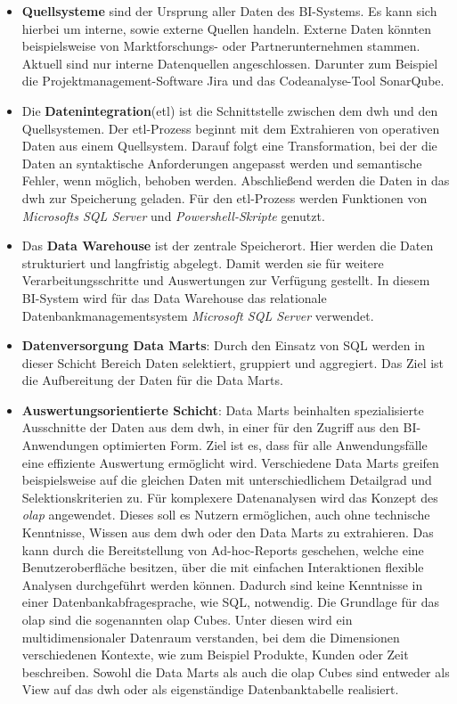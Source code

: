 \begin{itemize}
\item \textbf{Quellsysteme} sind der Ursprung aller Daten des BI-Systems. Es kann sich hierbei um interne, sowie externe Quellen handeln. Externe Daten könnten beispielsweise von Marktforschungs- oder Partnerunternehmen stammen. Aktuell sind nur interne Datenquellen angeschlossen. Darunter zum Beispiel die Projektmanagement-Software Jira und das Codeanalyse-Tool SonarQube.
\item Die \textbf{Datenintegration}(\acs{etl}) ist die Schnittstelle zwischen dem \ac{dwh} und den Quellsystemen. Der \acs{etl}-Prozess beginnt mit dem Extrahieren von operativen Daten aus einem Quellsystem. Darauf folgt eine Transformation, bei der die Daten an syntaktische Anforderungen angepasst werden und semantische Fehler, wenn möglich, behoben werden. Abschließend werden die Daten in das \ac{dwh} zur Speicherung geladen. Für den \acs{etl}-Prozess werden Funktionen von \textit{Microsofts SQL Server} und \textit{Powershell-Skripte} genutzt.
\item Das \textbf{Data Warehouse} ist der zentrale Speicherort. Hier werden die Daten strukturiert und langfristig abgelegt. Damit werden sie für weitere Verarbeitungsschritte und Auswertungen zur Verfügung gestellt. In diesem BI-System wird für das Data Warehouse das relationale Datenbankmanagementsystem \textit{Microsoft SQL Server} verwendet.
\item \textbf{Datenversorgung Data Marts}: Durch den Einsatz von SQL werden in dieser Schicht Bereich Daten selektiert, gruppiert und aggregiert. Das Ziel ist die Aufbereitung der Daten für die Data Marts.
\item \textbf{Auswertungsorientierte Schicht}: Data Marts beinhalten spezialisierte Ausschnitte der Daten aus dem \ac{dwh}, in einer für den Zugriff aus den BI-Anwendungen optimierten Form. Ziel ist es, dass für alle Anwendungsfälle eine effiziente Auswertung ermöglicht wird. Verschiedene Data Marts greifen beispielsweise auf die gleichen Daten mit unterschiedlichem Detailgrad und Selektionskriterien zu. Für komplexere Datenanalysen wird das Konzept des \textit{\ac{olap}} angewendet. Dieses soll es Nutzern ermöglichen, auch ohne technische Kenntnisse, Wissen aus dem \ac{dwh} oder den Data Marts zu extrahieren. Das kann durch die Bereitstellung von Ad-hoc-Reports geschehen, welche eine Benutzeroberfläche besitzen, über die mit einfachen Interaktionen flexible Analysen durchgeführt werden können. Dadurch sind keine Kenntnisse in einer Datenbankabfragesprache, wie SQL, notwendig. Die Grundlage für das \ac{olap} sind die sogenannten \ac{olap} Cubes. Unter diesen wird ein multidimensionaler Datenraum verstanden, bei dem die Dimensionen verschiedenen Kontexte, wie zum Beispiel Produkte, Kunden oder Zeit beschreiben. Sowohl die Data Marts als auch die \ac{olap} Cubes sind entweder als View auf das \ac{dwh} oder als eigenständige Datenbanktabelle realisiert.

\end{itemize}
